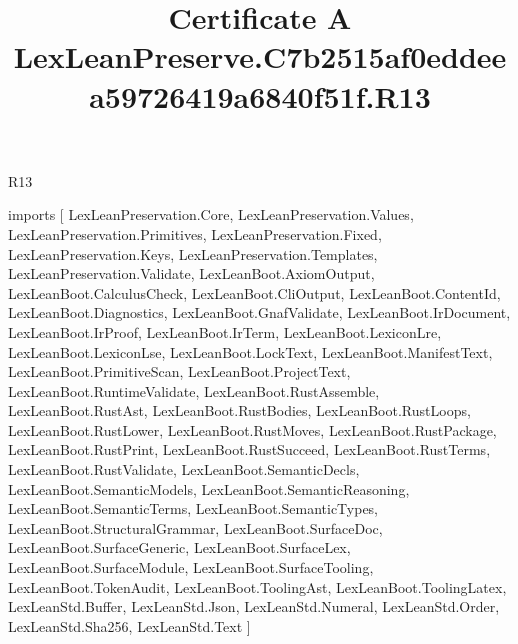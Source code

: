 \begin{lexlean}{R13}
\title{Certificate A LexLeanPreserve.C7b2515af0eddeea59726419a6840f51f.R13}
\begin{coremodule}
imports [
  LexLeanPreservation.Core,
  LexLeanPreservation.Values,
  LexLeanPreservation.Primitives,
  LexLeanPreservation.Fixed,
  LexLeanPreservation.Keys,
  LexLeanPreservation.Templates,
  LexLeanPreservation.Validate,
  LexLeanBoot.AxiomOutput,
  LexLeanBoot.CalculusCheck,
  LexLeanBoot.CliOutput,
  LexLeanBoot.ContentId,
  LexLeanBoot.Diagnostics,
  LexLeanBoot.GnafValidate,
  LexLeanBoot.IrDocument,
  LexLeanBoot.IrProof,
  LexLeanBoot.IrTerm,
  LexLeanBoot.LexiconLre,
  LexLeanBoot.LexiconLse,
  LexLeanBoot.LockText,
  LexLeanBoot.ManifestText,
  LexLeanBoot.PrimitiveScan,
  LexLeanBoot.ProjectText,
  LexLeanBoot.RuntimeValidate,
  LexLeanBoot.RustAssemble,
  LexLeanBoot.RustAst,
  LexLeanBoot.RustBodies,
  LexLeanBoot.RustLoops,
  LexLeanBoot.RustLower,
  LexLeanBoot.RustMoves,
  LexLeanBoot.RustPackage,
  LexLeanBoot.RustPrint,
  LexLeanBoot.RustSucceed,
  LexLeanBoot.RustTerms,
  LexLeanBoot.RustValidate,
  LexLeanBoot.SemanticDecls,
  LexLeanBoot.SemanticModels,
  LexLeanBoot.SemanticReasoning,
  LexLeanBoot.SemanticTerms,
  LexLeanBoot.SemanticTypes,
  LexLeanBoot.StructuralGrammar,
  LexLeanBoot.SurfaceDoc,
  LexLeanBoot.SurfaceGeneric,
  LexLeanBoot.SurfaceLex,
  LexLeanBoot.SurfaceModule,
  LexLeanBoot.SurfaceTooling,
  LexLeanBoot.TokenAudit,
  LexLeanBoot.ToolingAst,
  LexLeanBoot.ToolingLatex,
  LexLeanStd.Buffer,
  LexLeanStd.Json,
  LexLeanStd.Numeral,
  LexLeanStd.Order,
  LexLeanStd.Sha256,
  LexLeanStd.Text
]


\end{coremodule}
\end{lexlean}
